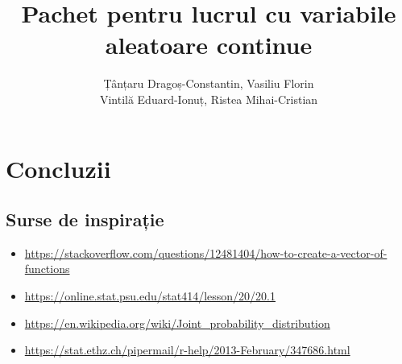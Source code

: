 \documentclass[12pt]{article}
\title{Pachet pentru lucrul cu variabile aleatoare continue}
\author{Țânțaru Dragoș-Constantin, Vasiliu Florin \\Vintilă Eduard-Ionuț, Ristea Mihai-Cristian}
\begin{document}
\section{Concluzii}
\subsection{Surse de inspirație}
\begin{itemize}
	\item \url{https://stackoverflow.com/questions/12481404/how-to-create-a-vector-of-functions}
	\item \url{https://online.stat.psu.edu/stat414/lesson/20/20.1}
	\item \url{https://en.wikipedia.org/wiki/Joint_probability_distribution}
	\item \url{https://stat.ethz.ch/pipermail/r-help/2013-February/347686.html}
	
\end{itemize}
\end{document}
